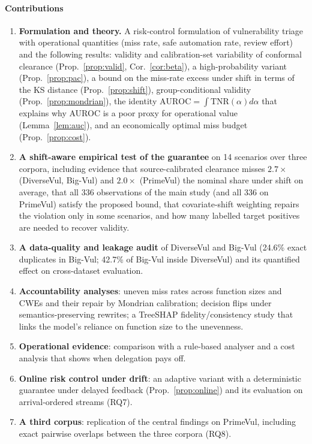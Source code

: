 \paragraph{Contributions}
\begin{enumerate}[itemsep=1pt]
\item \textbf{Formulation and theory.} A risk-control formulation of vulnerability triage with operational quantities (miss rate, safe automation rate, review effort) and the following results: validity and calibration-set variability of conformal clearance (Prop.~\ref{prop:valid}, Cor.~\ref{cor:beta}), a high-probability variant (Prop.~\ref{prop:pac}), a bound on the miss-rate excess under shift in terms of the KS distance (Prop.~\ref{prop:shift}), group-conditional validity (Prop.~\ref{prop:mondrian}), the identity $\mathrm{AUROC}=\int\mathrm{TNR}(\alpha)d\alpha$ that explains why AUROC is a poor proxy for operational value (Lemma~\ref{lem:auc}), and an economically optimal miss budget (Prop.~\ref{prop:cost}).
\item \textbf{A shift-aware empirical test of the guarantee} on 14 scenarios over three corpora, including evidence that source-calibrated clearance misses $2.7\times$ (DiverseVul, Big-Vul) and $2.0\times$ (PrimeVul) the nominal share under shift on average, that all 336 observations of the main study (and all 336 on PrimeVul) satisfy the proposed bound, that covariate-shift weighting repairs the violation only in some scenarios, and how many labelled target positives are needed to recover validity.
\item \textbf{A data-quality and leakage audit} of DiverseVul and Big-Vul (24.6\% exact duplicates in Big-Vul; 42.7\% of Big-Vul inside DiverseVul) and its quantified effect on cross-dataset evaluation.
\item \textbf{Accountability analyses}: uneven miss rates across function sizes and CWEs and their repair by Mondrian calibration; decision flips under semantics-preserving rewrites; a TreeSHAP fidelity/consistency study that links the model's reliance on function size to the unevenness.
\item \textbf{Operational evidence}: comparison with a rule-based analyser and a cost analysis that shows when delegation pays off.
\item \textbf{Online risk control under drift}: an adaptive variant with a deterministic guarantee under delayed feedback (Prop.~\ref{prop:online}) and its evaluation on arrival-ordered streams (RQ7).
\item \textbf{A third corpus}: replication of the central findings on PrimeVul, including exact pairwise overlaps between the three corpora (RQ8).

\end{enumerate}
